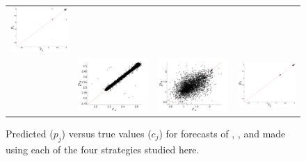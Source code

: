 \begin{figure}
\begin{tabular}{m{}|CCC}
    \includegraphics[width=0.6\columnwidth]{figs/svdfiveARIMAForecast} \\
     &
    \includegraphics[width=0.6\columnwidth]{figs/colLMAForecast} &
    \includegraphics[width=0.6\columnwidth]{figs/gccLMAForecast} &
    \includegraphics[width=0.6\columnwidth]{figs/svdfiveLMAForecast}
  \end{tabular}
  \caption{Predicted ($p_j$) versus true values ($c_j$) for forecasts
    of \col, \gcc, and \svdfive made using each of the four 
    strategies studied here.  }
  \label{fig:forecast-example}
\end{figure}
